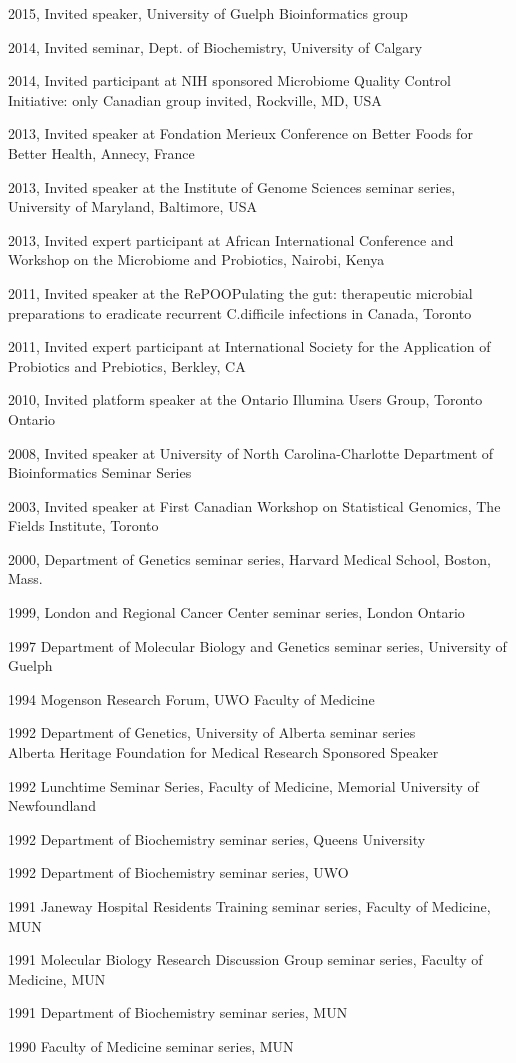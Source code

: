 \documentclass[11pt]{article}
\begin{document}
\begin{description}
\item 2015,  Invited speaker, University of Guelph Bioinformatics group
\item 2014,     Invited seminar, Dept. of Biochemistry, University of Calgary
\item 2014, 	Invited participant at NIH sponsored Microbiome Quality Control Initiative: only Canadian group invited, Rockville, MD, USA
\item 2013, 	Invited speaker at Fondation Merieux Conference on Better Foods for Better Health, Annecy, France
\item 2013, 	Invited speaker at the Institute of Genome Sciences seminar series, University of Maryland, Baltimore, USA
\item 2013, 	Invited expert participant at African International Conference and Workshop on the Microbiome and Probiotics, Nairobi, Kenya
\item 2011, 	Invited speaker at the RePOOPulating the gut: therapeutic microbial preparations to eradicate recurrent C.difficile infections in Canada, Toronto
\item 2011, 	Invited expert participant at International Society for the Application of Probiotics and Prebiotics, Berkley, CA
\item 2010, 	Invited platform speaker at the Ontario Illumina Users Group, Toronto Ontario 
\item 2008, 	Invited speaker at University of North Carolina-Charlotte Department of Bioinformatics Seminar Series
\item 2003, Invited speaker at First Canadian Workshop on Statistical Genomics, The Fields Institute, Toronto 
\item 2000,	 Department of Genetics seminar series, Harvard Medical School, Boston, Mass.
\item 1999,	 London and Regional Cancer Center seminar series, London Ontario
\item  1997	Department of Molecular Biology and Genetics seminar series, 	University of Guelph
\item 1994	 Mogenson Research Forum, UWO 	Faculty of Medicine
\item 1992	Department of Genetics, University of 	Alberta seminar series\\
		Alberta Heritage Foundation for Medical Research 	Sponsored Speaker
\item  1992	Lunchtime Seminar Series, Faculty of Medicine, 	Memorial University of Newfoundland
\item 1992 Department of Biochemistry seminar series, Queens University
\item  1992 Department of Biochemistry seminar series, UWO
\item 1991 Janeway Hospital Residents Training seminar series,  Faculty of Medicine, MUN
\item 1991 Molecular Biology Research Discussion Group seminar series, Faculty of Medicine, MUN
\item 1991	 Department of Biochemistry seminar series, MUN
\item 1990 Faculty of Medicine seminar series, MUN
\end{description}
\end{document}

